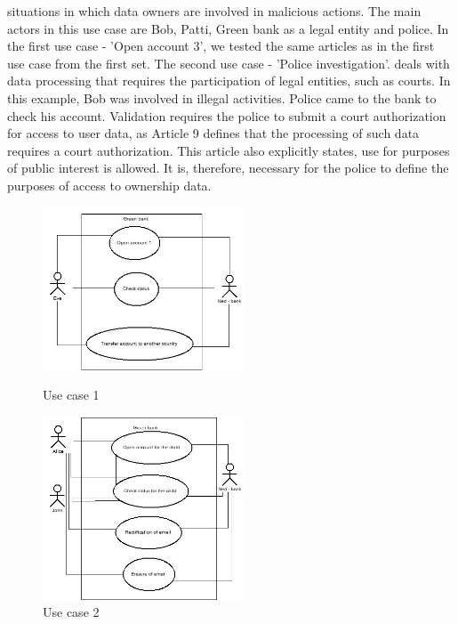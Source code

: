\documentclass[11pt,english]{article}
\begin{document}
situations in which data owners are involved in malicious actions. The main actors in this use case are Bob, Patti, Green bank as a legal entity and police. In the first use case - 'Open account 3', we tested the same articles as in the first use case from the first set. The second use case - 'Police investigation'. deals with data processing that requires the participation of legal entities, such as courts. In this example, Bob was involved in illegal activities. Police came to the bank to check his account. Validation requires the police to submit a court authorization for access to user data, as Article 9 defines that the processing of such data requires a court authorization. This article also explicitly states, use for purposes of public interest is allowed. It is, therefore, necessary for the police to define the purposes of access to ownership data.
\begin{figure}[H]
\centering
\begin{minipage}{.5\textwidth}
  \centering
  \includegraphics[width=6cm,scale=0.5]{images/use case1.jpg}
  \caption{Use case 1}
  \label{fig:usecase1}
\end{minipage}%
\begin{minipage}{.5\textwidth}
  \centering
  \includegraphics[width=6cm,scale=0.5]{images/use case2.jpg}
  \caption{Use case 2}
  \label{fig:usecase2}
\end{minipage}
\end{figure}
\end{document}

